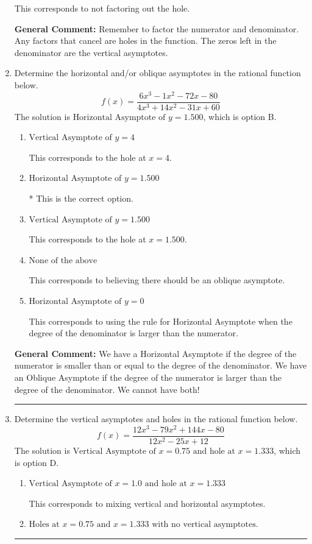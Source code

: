 \documentclass{extbook}[14pt]
\newcommand{\litem}[1]{\item #1

\rule{\textwidth}{0.4pt}}
\begin{document}
\begin{enumerate}
{\begin{enumerate}[label=\Alph*.]
This corresponds to not factoring out the hole.
\end{enumerate}

\textbf{General Comment:} Remember to factor the numerator and denominator. Any factors that cancel are holes in the function. The zeros left in the denominator are the vertical asymptotes.
}
\litem{
Determine the horizontal and/or oblique asymptotes in the rational function below.
\[ f(x) = \frac{6x^{3} -1 x^{2} -72 x -80}{4x^{3} +14 x^{2} -31 x + 60} \]The solution is \( \text{Horizontal Asymptote of } y = 1.500  \), which is option B.\begin{enumerate}[label=\Alph*.]
\item \( \text{Vertical Asymptote of } y = 4  \)

This corresponds to the hole at $x = 4$.
\item \( \text{Horizontal Asymptote of } y = 1.500  \)

* This is the correct option.
\item \( \text{Vertical Asymptote of } y = 1.500  \)

This corresponds to the hole at $x = 1.500$.
\item \( \text{None of the above} \)

This corresponds to believing there should be an oblique asymptote.
\item \( \text{Horizontal Asymptote of } y = 0  \)

This corresponds to using the rule for Horizontal Asymptote when the degree of the denominator is larger than the numerator.
\end{enumerate}

\textbf{General Comment:} We have a Horizontal Asymptote if the degree of the numerator is smaller than or equal to the degree of the denominator. We have an Oblique Asymptote if the degree of the numerator is larger than the degree of the denominator. We cannot have both!
}
\litem{
Determine the vertical asymptotes and holes in the rational function below.
\[ f(x) = \frac{12x^{3} -79 x^{2} +144 x -80}{12x^{2} -25 x + 12} \]The solution is \( \text{Vertical Asymptote of } x = 0.75 \text{ and hole at } x = 1.333 \), which is option D.\begin{enumerate}[label=\Alph*.]
\item \( \text{Vertical Asymptote of } x = 1.0 \text{ and hole at } x = 1.333 \)

This corresponds to mixing vertical and horizontal asymptotes.
\item \( \text{Holes at } x = 0.75 \text{ and } x = 1.333 \text{ with no vertical asymptotes.} \)


\end{enumerate}}
\end{enumerate}
\end{document}
